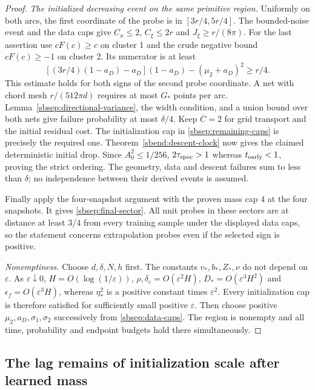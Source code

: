 \documentclass[11pt]{article}
\theoremstyle{remark}
\begin{document}
\begin{proof}
\emph{The initialized decreasing event on the same primitive region.}
Uniformly on both arcs, the first coordinate of the probe is in
$[3r/4,5r/4]$. The bounded-noise event and the data caps give
$C_x\le2$, $C_\xi\le2r$ and $J_\xi\ge r/(8\pi)$.
For the last assertion use $cF(c)\ge c$ on cluster 1 and the crude
negative bound $cF(c)\ge-1$ on cluster 2. Its numerator is at least
\[
 [(3r/4)(1-a_D)-a_D](1-a_D)-(\mu_2+a_D)^2\ge r/4.
\]
This estimate holds for both signs of the second probe coordinate.
A net with chord mesh $r/(512\pi d)$ requires at most $G_*$ points
per arc. Lemma~\ref{sbsep:directional-variance}, the width condition,
and a union bound over both nets give failure probability at most
$\delta/4$. Keep $\overline C=2$ for grid transport and the initial
residual cost. The initialization cap in
\eqref{sbsep:remaining-caps} is precisely the required one.
Theorem~\ref{sbend:descent-clock} now gives the claimed deterministic
initial drop. Since $A_0^2\le1/256$, $2\tau_{\rm spec}>1$ whereas
$t_{\rm early}<1$, proving the strict ordering.
The geometry, data and descent failures sum to less than $\delta$;
no independence between their derived events is assumed.

Finally apply the four-snapshot argument with the proven mass cap $4$
at the four snapshots. It gives \eqref{sbsep:final-sector}.
All unit probes in these sectors are at distance at least $3/4$ from
every training sample under the displayed data caps, so the statement
concerns extrapolation probes even if the selected sign is positive.

\emph{Nonemptiness.}
Choose $d,\delta,N,h$ first. The constants $v_*,b_*,Z_*,\nu$ do not
depend on $\varepsilon$. As $\varepsilon\downarrow0$,
$H=O(\log(1/\varepsilon))$, $\rho,\delta_c=O(\varepsilon^2H)$,
$D_*=O(\varepsilon^3H^2)$ and
$\epsilon_f=O(\varepsilon^3H)$, whereas $\eta_*^2$ is a positive
constant times $\varepsilon^2$. Every initialization cap is therefore
satisfied for sufficiently small positive $\varepsilon$. Then choose
positive $\mu_2,a_D,\sigma_1,\sigma_2$ successively from
\eqref{sbsep:data-caps}. The region is nonempty and all time, probability
and endpoint budgets hold there simultaneously.
\end{proof}

\subsection{The lag remains of initialization scale after learned mass}
\end{document}
